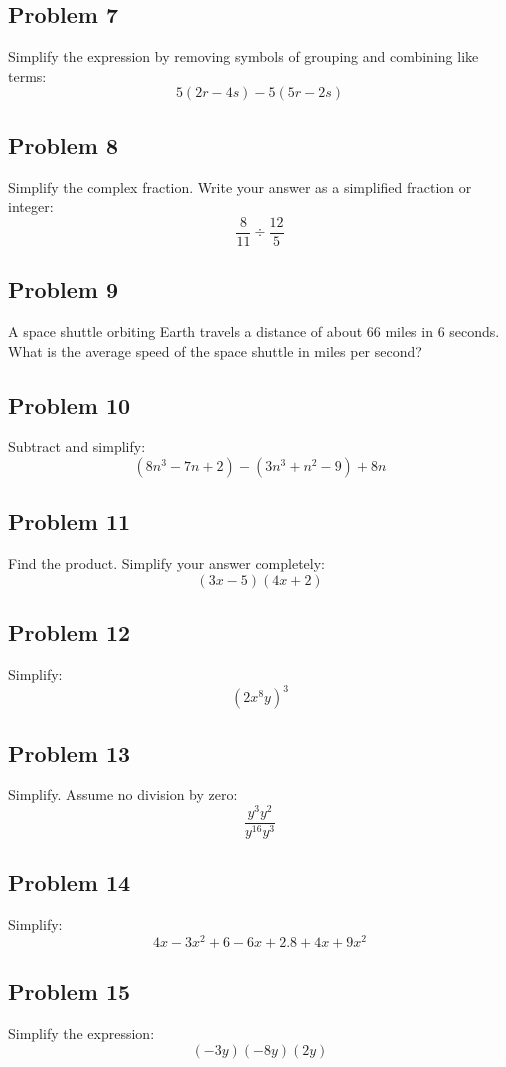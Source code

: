 \documentclass[12pt]{article}
\begin{document}
\subsection*{Problem 7}
Simplify the expression by removing symbols of grouping and combining like terms:  
\[
5(2r - 4s) - 5(5r - 2s)
\]

\subsection*{Problem 8}
Simplify the complex fraction. Write your answer as a simplified fraction or integer:  
\[
\dfrac{8}{11} \div \dfrac{12}{5}
\]

\subsection*{Problem 9}
A space shuttle orbiting Earth travels a distance of about 66 miles in 6 seconds.  
What is the average speed of the space shuttle in miles per second?

\subsection*{Problem 10}
Subtract and simplify:  
\[
(8n^3 - 7n + 2) - (3n^3 + n^2 - 9) + 8n
\]

\subsection*{Problem 11}
Find the product. Simplify your answer completely:  
\[
(3x - 5)(4x + 2)
\]

\subsection*{Problem 12}
Simplify:  
\[
(2x^8 y)^3
\]

\subsection*{Problem 13}
Simplify. Assume no division by zero:  
\[
\dfrac{y^3 y^2}{y^{16} y^3}
\]

\subsection*{Problem 14}
Simplify:  
\[
4x - 3x^2 + 6 - 6x + 2.8 + 4x + 9x^2
\]

\subsection*{Problem 15}
Simplify the expression:  
\[
(-3y)(-8y)(2y)
\]
\end{document}
